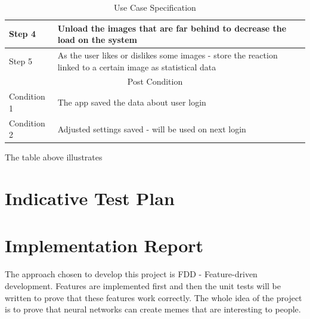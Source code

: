 \documentclass[12pt]{report}
\begin{document}
\begin{table}[h]
{\begin{tabular}{|lllll|}
                \multicolumn{1}{|l|}{Step 4}         & \multicolumn{4}{l|}{Unload the images that are far behind to decrease the load on the system}                                           \\ \hline
                \multicolumn{1}{|l|}{Step 5}         & \multicolumn{4}{l|}{As the user likes or dislikes some images - store the reaction linked to a certain image as statistical data}       \\ \hline
                \multicolumn{5}{|c|}{Post Condition}                                                                                                                                           \\ \hline
                \multicolumn{1}{|l|}{Condition 1}    & \multicolumn{4}{l|}{The app saved the data about user login}                                                                            \\ \hline
                \multicolumn{1}{|l|}{Condition 2}    & \multicolumn{4}{l|}{Adjusted settings saved - will be used on next login}                                                               \\ \hline
            \end{tabular}%
        }
        \caption{Use Case Specification}
    \end{table}

    The table above illustrates

    \section*{Indicative Test Plan}
    \paragraph{}

    \section*{Implementation Report}
    \paragraph{}

    The approach chosen to develop this project is FDD - Feature-driven development. Features are implemented first and then the unit tests will be written to prove that these features work correctly. The whole idea of the project is to prove that neural networks can create memes that are interesting to people.
\end{document}
